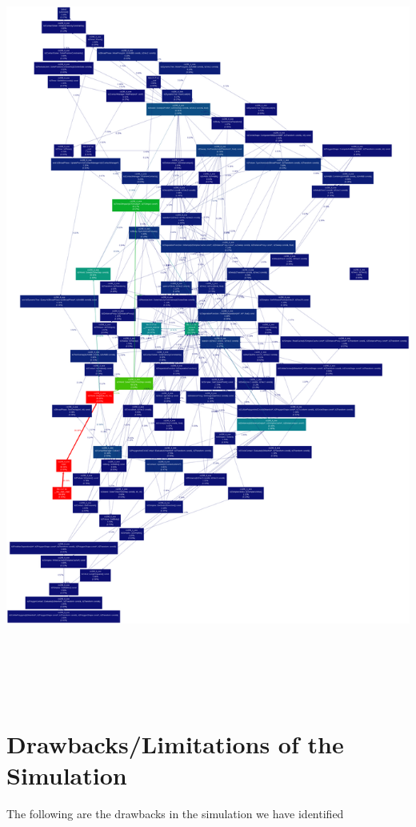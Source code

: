 \documentclass[11pt]{article}
\begin{document}
\begin{center}
	\includegraphics[height=25cm]{./images/plots/fdp.png}
\end{center}

\section{Drawbacks/Limitations of the Simulation} 
The following are the drawbacks in the simulation we have identified
\end{document}
